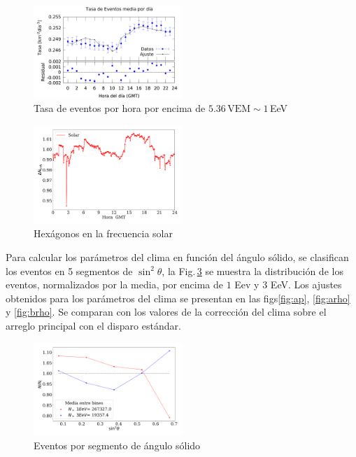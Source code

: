 \begin{figure}[H]
	\centering
	\includegraphics[width=0.5\textwidth]{figura_tasa_por_hora_del_dia.png}
	\caption{Tasa de eventos por hora por encima de  $5.36\, \text{VEM} \sim 1 $\,EeV}
	\label{fig:hora}
\end{figure}

\begin{figure}[H]
	\centering
	\includegraphics[width=0.5\textwidth]{figura_pesos_solar.pdf}
	\caption{Hexágonos en la frecuencia  solar}
	\label{fig:pesos_solar}
\end{figure}

Para  calcular los parámetros del clima en función del ángulo sólido, se clasifican los eventos en 5 segmentos de $\sin^2\theta$, la Fig.\,\ref{fig:angulo} se muestra la distribución de los eventos, normalizados por la media, por encima de $1$ Eev y $3$ EeV. Los ajustes  obtenidos para los parámetros del clima se presentan en las figs\ref{fig:ap}, \ref{fig:arho} y \ref{fig:brho}. Se comparan con los valores de la corrección del clima sobre el arreglo principal con el disparo estándar.

\begin{figure}[H]
	\centering
	\includegraphics[width=0.5\textwidth]{figura_eventos_por_bin.pdf}
	\caption{Eventos por segmento de ángulo sólido}
	\label{fig:angulo}
\end{figure}

